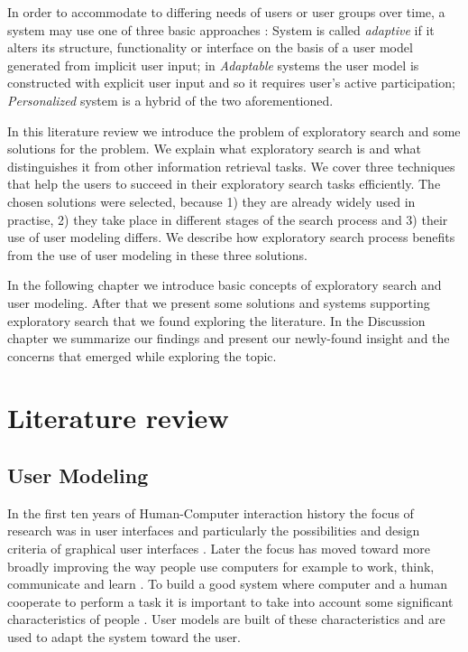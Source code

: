 \documentclass{sigchi}
\begin{document}
In order to accommodate to differing needs of users or user groups over time, a system may use one of three basic approaches \cite{van08}: System is called \textit{adaptive} if it alters its structure, functionality or interface on the basis of a user model generated from implicit user input; in \textit{Adaptable} systems the user model is constructed with explicit user input and so it requires user's active participation; \textit{Personalized} system is a hybrid of the two aforementioned. 

In this literature review we introduce the problem of exploratory search and some solutions for the problem.
We explain what exploratory search is and what distinguishes it from other information retrieval tasks.
We cover three techniques that help the users to succeed in their exploratory search tasks efficiently.
The chosen solutions were selected, because 1) they are already widely used in practise, 2) they take place in different stages of the search process and 3) their use of user modeling differs.
We describe how exploratory search process benefits from the use of user modeling in these three solutions.

In the following chapter we introduce basic concepts of exploratory search and user modeling.
After that we present some solutions and systems supporting exploratory search that we found exploring the literature.
In the Discussion chapter we summarize our findings and present our newly-found insight and the concerns that emerged while exploring the topic.

\section{Literature review}
\label{sec:litreview}



\subsection{User Modeling}

In the first ten years of Human-Computer interaction history the focus of research was in user interfaces and particularly the possibilities and design criteria of graphical user interfaces \cite{fischer01}. Later the focus has moved toward more broadly improving the way people use computers for example to work, think, communicate and learn \cite{fischer01}. To build a good system where computer and a human cooperate to perform a task it is important to take into account some significant characteristics of people \cite{rich99}. User models are built of these characteristics and are used to adapt the system toward the user.
\end{document}
